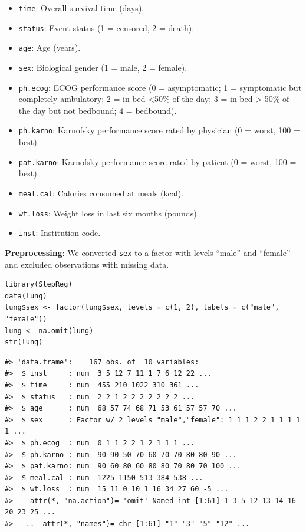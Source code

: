 \begin{itemize}
\item
  \texttt{time}: Overall survival time (days).
\item
  \texttt{status}: Event status (1 = censored, 2 = death).
\item
  \texttt{age}: Age (years).
\item
  \texttt{sex}: Biological gender (1 = male, 2 = female).
\item
  \texttt{ph.ecog}: ECOG performance score (0 = asymptomatic; 1 = symptomatic but completely ambulatory; 2 = in bed \textless50\% of the day; 3 = in bed \textgreater{} 50\% of the day but not bedbound; 4 = bedbound).
\item
  \texttt{ph.karno}: Karnofsky performance score rated by physician (0 = worst, 100 = best).
\item
  \texttt{pat.karno}: Karnofsky performance score rated by patient (0 = worst, 100 = best).
\item
  \texttt{meal.cal}: Calories consumed at meals (kcal).
\item
  \texttt{wt.loss}: Weight loss in last six months (pounds).
\item
  \texttt{inst}: Institution code.
\end{itemize}

\textbf{Preprocessing}: We converted \texttt{sex} to a factor with levels ``male'' and ``female'' and excluded observations with missing data.

\begin{verbatim}
library(StepReg)
data(lung)
lung$sex <- factor(lung$sex, levels = c(1, 2), labels = c("male", "female"))
lung <- na.omit(lung)
str(lung)
\end{verbatim}

\begin{verbatim}
#> 'data.frame':    167 obs. of  10 variables:
#>  $ inst     : num  3 5 12 7 11 1 7 6 12 22 ...
#>  $ time     : num  455 210 1022 310 361 ...
#>  $ status   : num  2 2 1 2 2 2 2 2 2 2 ...
#>  $ age      : num  68 57 74 68 71 53 61 57 57 70 ...
#>  $ sex      : Factor w/ 2 levels "male","female": 1 1 1 2 2 1 1 1 1 1 ...
#>  $ ph.ecog  : num  0 1 1 2 2 1 2 1 1 1 ...
#>  $ ph.karno : num  90 90 50 70 60 70 70 80 80 90 ...
#>  $ pat.karno: num  90 60 80 60 80 80 70 80 70 100 ...
#>  $ meal.cal : num  1225 1150 513 384 538 ...
#>  $ wt.loss  : num  15 11 0 10 1 16 34 27 60 -5 ...
#>  - attr(*, "na.action")= 'omit' Named int [1:61] 1 3 5 12 13 14 16 20 23 25 ...
#>   ..- attr(*, "names")= chr [1:61] "1" "3" "5" "12" ...
\end{verbatim}

